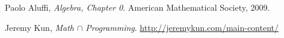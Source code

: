 \documentclass[a4paper, 11pt]{amsart}
\theoremstyle{definition}
\theoremstyle{remark}
\numberwithin{equation}{section}
\begin{document}
  \vfill
  \begin{thebibliography}{9}

    Paolo Aluffi,
    \emph{Algebra, Chapter 0}.
    American Mathematical Society,
    2009.

    Jeremy Kun,
    \emph{Math $\cap$ Programming}.
    \url{http://jeremykun.com/main-content/}
  \end{thebibliography}

  
\end{document}
